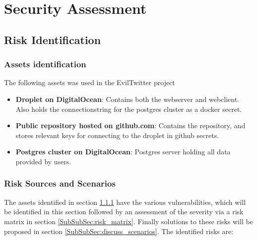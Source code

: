 \documentclass[main.tex]{subfiles}
\begin{document}
    \section{Security Assessment}
    \label{Sec:security}
        \subsection{Risk Identification}
            \subsubsection{Assets identification}
            \label{SubSubSec:assets_identification}
                The following assets was used in the EvilTwitter project
            
                \begin{itemize}
                    \item \textbf{Droplet on DigitalOcean}: Contains both the webserver and webclient. Also holds the connectionstring for the postgres cluster as a docker secret.
                    \item \textbf{Public repository hosted on github.com}: Contains the repository, and stores relevant keys for connecting to the droplet in github secrets. 
                    \item \textbf{Postgres cluster on DigitalOcean}: Postgres server holding all data provided by users. 
                \end{itemize}
        
            \subsubsection{Risk Sources and Scenarios}
            \label{SubSubSec:risk_sources_and_scenarios}
                The assets identified in section \ref{SubSubSec:assets_identification} have the various vulnerabilities, which will be identified in this section followed by an assessment of the severity via a risk matrix in section \ref{SubSubSec:risk_matrix}. Finally solutions to these risks will be proposed in section \ref{SubSubSec:discuss_scenarios}. The identified risks are:
            
\end{document}
